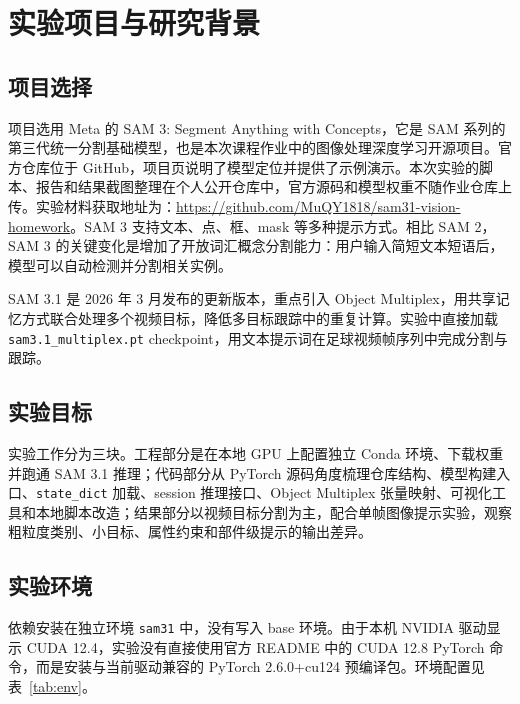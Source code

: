 \documentclass[UTF8,a4paper,zihao=-4,fontset=none]{ctexart}
\begin{document}
\section{实验项目与研究背景}

\subsection{项目选择}

项目选用 Meta 的 SAM 3: Segment Anything with Concepts，它是 SAM 系列的第三代统一分割基础模型，也是本次课程作业中的图像处理深度学习开源项目。官方仓库位于 GitHub\cite{sam3_github}，项目页说明了模型定位并提供了示例演示\cite{sam3_project}。本次实验的脚本、报告和结果截图整理在个人公开仓库中\cite{homework_repo}，官方源码和模型权重不随作业仓库上传。实验材料获取地址为：\url{https://github.com/MuQY1818/sam31-vision-homework}。SAM 3 支持文本、点、框、mask 等多种提示方式。相比 SAM 2，SAM 3 的关键变化是增加了开放词汇概念分割能力：用户输入简短文本短语后，模型可以自动检测并分割相关实例。

SAM 3.1 是 2026 年 3 月发布的更新版本，重点引入 Object Multiplex，用共享记忆方式联合处理多个视频目标，降低多目标跟踪中的重复计算\cite{sam3_release}。实验中直接加载 \texttt{sam3.1\_multiplex.pt} checkpoint，用文本提示词在足球视频帧序列中完成分割与跟踪。

\subsection{实验目标}

实验工作分为三块。工程部分是在本地 GPU 上配置独立 Conda 环境、下载权重并跑通 SAM 3.1 推理；代码部分从 PyTorch 源码角度梳理仓库结构、模型构建入口、\texttt{state\_dict} 加载、session 推理接口、Object Multiplex 张量映射、可视化工具和本地脚本改造；结果部分以视频目标分割为主，配合单帧图像提示实验，观察粗粒度类别、小目标、属性约束和部件级提示的输出差异。

\subsection{实验环境}

依赖安装在独立环境 \texttt{sam31} 中，没有写入 base 环境。由于本机 NVIDIA 驱动显示 CUDA 12.4，实验没有直接使用官方 README 中的 CUDA 12.8 PyTorch 命令，而是安装与当前驱动兼容的 PyTorch 2.6.0+cu124 预编译包\cite{pytorch_install}。环境配置见表~\ref{tab:env}。
\end{document}
